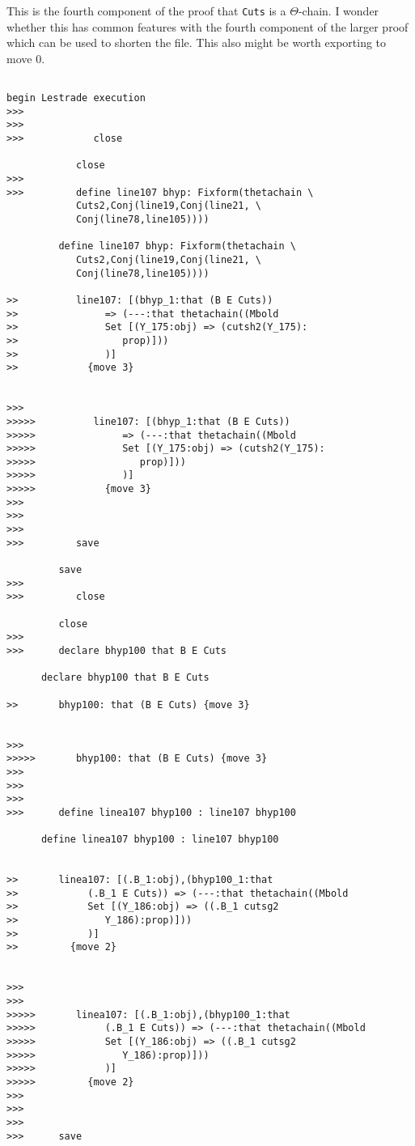 \documentclass[12pt]{article}
\begin{document}
This is the fourth component of the proof that {\tt Cuts} is a $\Theta$-chain.  I wonder whether this has common features with the fourth component of the larger proof
which can be used to shorten the file.  This also might be worth exporting to move 0.

\begin{verbatim}

begin Lestrade execution
>>>
>>>
>>>            close

            close
>>>
>>>         define line107 bhyp: Fixform(thetachain \
            Cuts2,Conj(line19,Conj(line21, \
            Conj(line78,line105))))

         define line107 bhyp: Fixform(thetachain \
            Cuts2,Conj(line19,Conj(line21, \
            Conj(line78,line105))))

>>          line107: [(bhyp_1:that (B E Cuts))
>>               => (---:that thetachain((Mbold
>>               Set [(Y_175:obj) => (cutsh2(Y_175):
>>                  prop)]))
>>               )]
>>            {move 3}


>>>
>>>>>          line107: [(bhyp_1:that (B E Cuts))
>>>>>               => (---:that thetachain((Mbold
>>>>>               Set [(Y_175:obj) => (cutsh2(Y_175):
>>>>>                  prop)]))
>>>>>               )]
>>>>>            {move 3}
>>>
>>>
>>>
>>>         save

         save
>>>
>>>         close

         close
>>>
>>>      declare bhyp100 that B E Cuts

      declare bhyp100 that B E Cuts

>>       bhyp100: that (B E Cuts) {move 3}


>>>
>>>>>       bhyp100: that (B E Cuts) {move 3}
>>>
>>>
>>>
>>>      define linea107 bhyp100 : line107 bhyp100

      define linea107 bhyp100 : line107 bhyp100


>>       linea107: [(.B_1:obj),(bhyp100_1:that
>>            (.B_1 E Cuts)) => (---:that thetachain((Mbold
>>            Set [(Y_186:obj) => ((.B_1 cutsg2
>>               Y_186):prop)]))
>>            )]
>>         {move 2}


>>>
>>>
>>>>>       linea107: [(.B_1:obj),(bhyp100_1:that
>>>>>            (.B_1 E Cuts)) => (---:that thetachain((Mbold
>>>>>            Set [(Y_186:obj) => ((.B_1 cutsg2
>>>>>               Y_186):prop)]))
>>>>>            )]
>>>>>         {move 2}
>>>
>>>
>>>
>>>      save


\end{verbatim}
\end{document}
